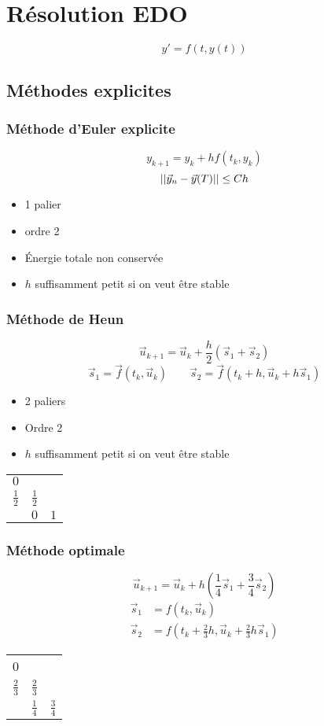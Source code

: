 \documentclass[resume]{subfiles}
\begin{document}
\section{Résolution EDO}
$$\boxed{y'=f(t,y(t))}$$
\subsection{Méthodes explicites}
\subsubsection{Méthode d'Euler explicite}
$$y_{k+1}=y_k+hf(t_k,y_k)$$
$$\abs{\abs{\vec{y}_n-\vec{y}(T)}}\leq Ch$$
\begin{itemize}
\item 1 palier
\item ordre 2
\item Énergie totale non conservée
\item $h$ suffisamment petit si on veut être stable
\end{itemize}
\subsubsection{Méthode de Heun}
$$\vec{u}_{k+1}=\vec{u}_k+\frac{h}{2}\left(\vec{s}_1+\vec{s}_2\right)$$
$$\vec{s}_1=\vec{f}(t_k,\vec{u}_k)\qquad \vec{s}_2=\vec{f}(t_k+h,\vec{u}_k+h\vec{s}_1)$$

\begin{itemize}
\item 2 paliers
\item Ordre 2
\item $h$ suffisamment petit si on veut être stable
\end{itemize}
\begin{table}[H]
\centering
\begin{tabular}{c|cc}
$0$ & \\
$\frac{1}{2}$ & $\frac{1}{2}$\\\hline
 & $0$ & $1$
\end{tabular}
\end{table}
\subsubsection{Méthode optimale}
$$\boxed{\vec{u}_{k+1}=\vec{u}_k+h\left(\frac{1}{4}\vec{s}_1+\frac{3}{4}\vec{s}_2\right)}$$
\begin{align*}
\vec{s}_1&=f(t_k,\vec{u}_k)\\
\vec{s}_2&=f\left(t_k+\frac{2}{3}h,\vec{u}_k+\frac{2}{3}h\vec{s}_1\right)
\end{align*}
\begin{table}[H]
\centering
\begin{tabular}{c|cc}
0 &\\
$\frac{2}{3}$ & $\frac{2}{3}$\\\hline
 & $\frac{1}{4}$ & $\frac{3}{4}$
\end{tabular}
\end{table}
\end{document}
